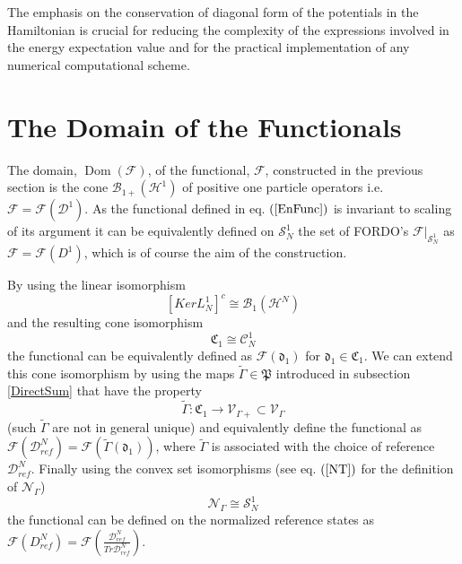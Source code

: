 \documentclass[aps,preprint]{revtex4}%
\begin{document}
The emphasis on the conservation of diagonal form of the potentials in the
Hamiltonian is crucial for reducing the complexity of the expressions involved
in the energy expectation value and for the practical implementation of any
numerical computational scheme.

\section{The Domain of the Functionals}

\label{Domain}

The domain, $\operatorname{Dom}\left(  \mathcal{F}\right)  $, of the
functional, $\mathcal{F}$, constructed in the previous section is the cone
$\mathcal{B}_{1+}\left(  \mathcal{H}^{1}\right)  $ of positive one particle
operators i.e. $\mathcal{F}=\mathcal{F}\left(  \mathcal{D}^{1}\right)  $. As
the functional defined in eq. $\left(  \ref{EnFunc}\right)  $ is invariant to
scaling of its argument it can be equivalently defined on $\mathcal{S}_{N}%
^{1}$ the set of FORDO's $\left.  \mathcal{F}\right\vert _{\mathcal{S}_{N}%
^{1}}$ as $\mathcal{F}=\mathcal{F}\left(  D^{1}\right)  $, which is of course
the aim of the construction.

By using the linear isomorphism
\begin{equation}
\left[  KerL_{N}^{1}\right]  ^{c}\cong\mathcal{B}_{1}\left(  \mathcal{H}%
^{N}\right)
\end{equation}
and the resulting cone isomorphism
\begin{equation}
\mathfrak{C}_{1}\cong\mathcal{C}_{N}^{1} \label{coneiso}%
\end{equation}
the functional can be equivalently defined as $\mathcal{F}\left(
\mathfrak{d}_{1}\right)  $ for $\mathfrak{d}_{1}\in\mathfrak{C}_{1}$. We can
extend this cone isomorphism by using the maps $\tilde{\Gamma}\in\mathfrak{P}$
introduced in subsection \ref{DirectSum} that have the property%
\begin{equation}
\tilde{\Gamma}:\mathfrak{C}_{1}\rightarrow\mathcal{V}_{\Gamma+}\subset
\mathcal{V}_{\Gamma}%
\end{equation}
(such $\tilde{\Gamma}$ are not in general unique) and equivalently define the
functional as $\mathcal{F}\left(  \mathcal{D}_{ref}^{N}\right)  =\mathcal{F}%
\left(  \tilde{\Gamma}\left(  \mathfrak{d}_{1}\right)  \right)  $, where
$\tilde{\Gamma}$ is associated with the choice of reference $\mathcal{D}%
_{ref}^{N}$. Finally using the convex set isomorphisms (see eq. $\left(
\ref{NT}\right)  $ for the definition of $\mathcal{N}_{\Gamma}$)
\begin{equation}
\mathcal{N}_{\Gamma}\cong\mathcal{S}_{N}^{1}%
\end{equation}
the functional can be defined on the normalized reference states as
$\mathcal{F}\left(  D_{ref}^{N}\right)  =\mathcal{F}\left(  \frac
{\mathcal{D}_{ref}^{N}}{Tr\mathcal{D}_{ref}^{N}}\right)  $.
\end{document}
